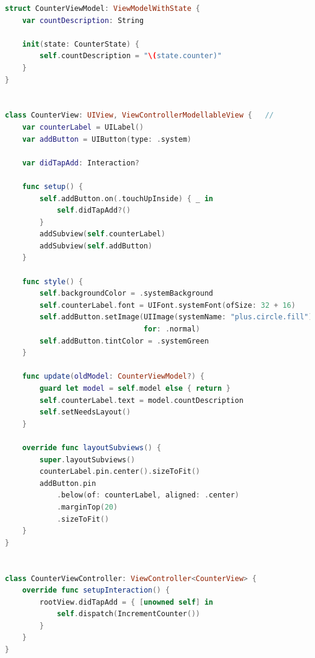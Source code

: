 \documentclass[a4paper, 11pt, parskip=half]{scrreprt}
\theoremstyle{definition}
\begin{document}
\begin{lstlisting}[language=swift, caption=Tempura example.]
struct CounterViewModel: ViewModelWithState {
    var countDescription: String

    init(state: CounterState) {
        self.countDescription = "\(state.counter)"
    }
}


class CounterView: UIView, ViewControllerModellableView {   //
    var counterLabel = UILabel()
    var addButton = UIButton(type: .system)

    var didTapAdd: Interaction?
    
    func setup() {
        self.addButton.on(.touchUpInside) { _ in
            self.didTapAdd?()
        }
        addSubview(self.counterLabel)
        addSubview(self.addButton)
    }

    func style() {
        self.backgroundColor = .systemBackground
        self.counterLabel.font = UIFont.systemFont(ofSize: 32 + 16)
        self.addButton.setImage(UIImage(systemName: "plus.circle.fill"), 
                                for: .normal)
        self.addButton.tintColor = .systemGreen
    }

    func update(oldModel: CounterViewModel?) {
        guard let model = self.model else { return }
        self.counterLabel.text = model.countDescription
        self.setNeedsLayout()
    }

    override func layoutSubviews() {
        super.layoutSubviews()
        counterLabel.pin.center().sizeToFit()
        addButton.pin
            .below(of: counterLabel, aligned: .center)
            .marginTop(20)
            .sizeToFit()
    }
}


class CounterViewController: ViewController<CounterView> {
    override func setupInteraction() {
        rootView.didTapAdd = { [unowned self] in
            self.dispatch(IncrementCounter())
        }
    }
}
\end{lstlisting}

\end{document}
